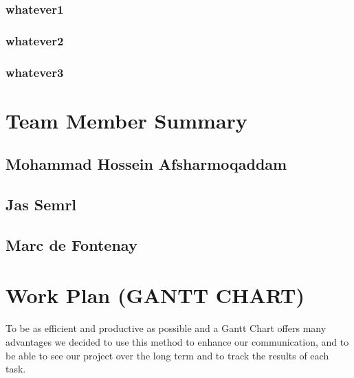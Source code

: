 \documentclass[12pt]{article}
\begin{document}
\par


\subsubsection{whatever1}


\subsubsection{whatever2}


\subsubsection{whatever3}



\newpage
\section{Team Member Summary}

\subsection{Mohammad Hossein Afsharmoqaddam}


\subsection{Jas Semrl}


\subsection{Marc de Fontenay}





\newpage
\section{Work Plan (GANTT CHART)}
To be as efficient and productive as possible and a Gantt Chart offers many advantages we decided to use this method to enhance our communication, and to be able to see our project over the long term and to track the results of each task. 
\par
\end{document}
